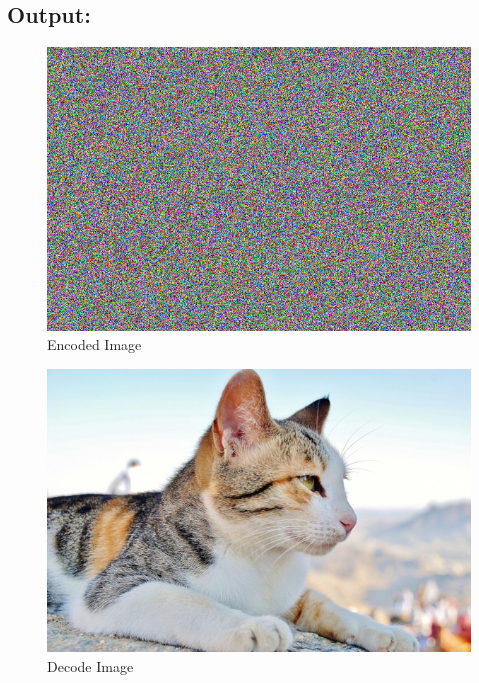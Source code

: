 \subsection{Output:}\label{sec:ps1b:output}
\begin{figure}[h]
    \centering
    \includegraphics[width=1\textwidth]{projectPictures/encode.png}
    \caption{Encoded Image}
    \label{fig:encode}
\end{figure}
\begin{figure}[h]
    \centering
    \includegraphics[width=1\textwidth]{projectPictures/Decode.png}
    \caption{Decode Image}
    \label{fig:decode}
\end{figure}


